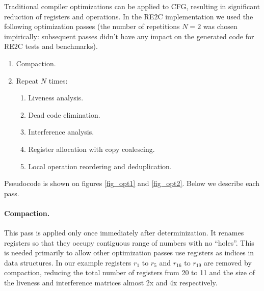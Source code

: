 \documentclass[]{article}
\begin{document}
Traditional compiler optimizations can be applied to CFG, resulting in significant reduction of registers and operations.
In the RE2C implementation we used the following optimization passes
(the number of repetitions $N=2$ was chosen impirically: subsequent passes didn't have any impact on the generated code for RE2C tests and benchmarks).

\begin{enumerate}[topsep = 0.5em]
    \item Compaction.
    \item Repeat $N$ times:
    \begin{enumerate}[label=\alph*.]
        \item Liveness analysis.
        \item Dead code elimination.
        \item Interference analysis.
        \item Register allocation with copy coalescing.
        \item Local operation reordering and deduplication.
    \end{enumerate}
\end{enumerate}

Pseudocode is shown on figures \ref{fig_opt1} and \ref{fig_opt2}.
Below we describe each pass.

\paragraph{Compaction.}
This pass is applied only once immediately after determinization.
It renames registers so that they occupy contiguous range of numbers with no ``holes''.
This is needed primarily to allow other optimization passes use registers as indices in data structures.
In our example registers $r_1$ to $r_5$ and $r_{16}$ to $r_{19}$ are removed by compaction,
reducing the total number of registers from 20 to 11 and the size of the liveness and interference matrices almost 2x and 4x respectively.
\\
\end{document}
